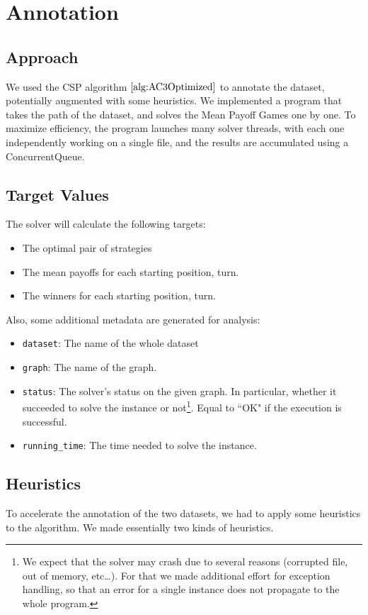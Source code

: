 \section{Annotation}
\subsection{Approach}
We used the CSP algorithm $\ref{alg:AC3Optimized}$ to annotate the dataset, potentially augmented with some heuristics. 
\newline We implemented a program that takes the path of the dataset, and solves the Mean Payoff Games one by one.
\newline To maximize efficiency, the program launches many solver threads, with each one independently working on a single file, and the results are accumulated using a ConcurrentQueue.
\subsection{Target Values}
The solver will calculate the following targets:
\begin{itemize}
	\item The optimal pair of strategies
	\item The mean payoffs for each starting position, turn.
	\item The winners for each starting position, turn.
\end{itemize}
Also, some additional metadata are generated for analysis:
\begin{itemize}
	\item \texttt{dataset}: The name of the whole dataset
	\item \texttt{graph}: The name of the graph.
	\item \texttt{status}: The solver's status on the given graph. In particular, whether it succeeded to solve the instance or not\footnote{We expect that the solver may crash due to several reasons (corrupted file, out of memory, etc\dots). For that we made additional effort for exception handling, so that an error for a single instance does not propagate to the whole program.}. Equal to ``OK" if the execution is successful.
	\item \texttt{running\_time}: The time needed to solve the instance.

\end{itemize}

\subsection{Heuristics}
To accelerate the annotation of the two datasets, we had to apply some heuristics to the algorithm. We made essentially two kinds of heuristics.
